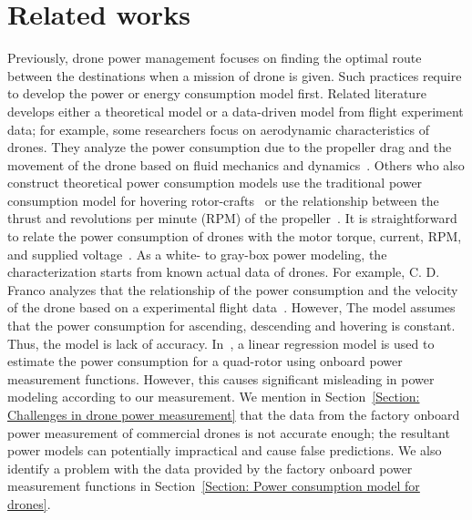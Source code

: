 \documentclass[journal]{./template/IEEEtran}
\begin{document}
\section{Related works}

Previously, drone power management focuses on finding the optimal route between the destinations when a mission of drone is given.
Such practices require to develop the power or energy consumption model first. 
Related literature develops either a theoretical model or a data-driven model from flight experiment data; for example, some researchers focus on aerodynamic characteristics of drones.
They analyze the power consumption due to the propeller drag and the movement of the drone based on fluid mechanics and dynamics~\cite{ref_3}. 
Others who also construct theoretical power consumption models use the traditional power consumption model for hovering rotor-crafts~\cite{ref_4} 
or the relationship between the thrust and revolutions per minute (RPM) of the propeller~\cite{ref_5}. 
It is straightforward to relate the power consumption of drones with the motor torque, current, RPM, and supplied voltage~\cite{ref_6,ref_7}. 
As a white- to gray-box power modeling, the characterization starts from known actual data of drones. For example, C. D. Franco analyzes that the relationship of the power consumption and the velocity of the drone based on a experimental flight data~\cite{ref_8}.  
However, The model assumes that the power consumption for ascending, descending and hovering is constant. Thus, the model is lack of accuracy.
In~\cite{ref_9}, a linear regression model is used to estimate the power consumption for a quad-rotor using onboard power measurement functions. 
However, this causes significant misleading in power modeling according to our measurement.
We mention in Section~\ref{Section: Challenges in drone power measurement} that the data from the factory onboard power measurement of commercial drones is not accurate enough; the resultant power models can potentially impractical and cause false predictions.
We also identify a problem with the data provided by the factory onboard power measurement functions in Section~\ref{Section: Power consumption model for drones}.
\end{document}
